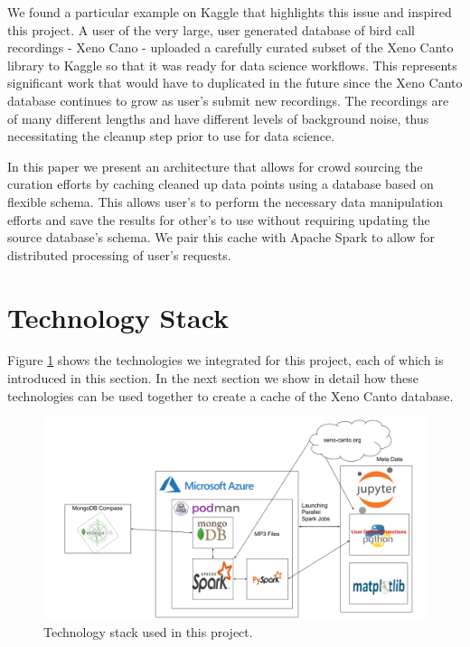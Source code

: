 \documentclass[conference,twoside]{IEEEtran}
\begin{document}
We found a particular example on Kaggle that highlights this issue and inspired this project. A user of the very large, user generated database of bird call recordings - Xeno Cano\cite{xenocanto} - uploaded a carefully curated subset of the Xeno Canto library to Kaggle so that it was ready for data science workflows\cite{xenocantokaggle}. This represents significant work that would have to duplicated in the future since the Xeno Canto database continues to grow as user's submit new recordings. The recordings are of many different lengths and have different levels of background noise, thus necessitating the cleanup step prior to use for data science.

In this paper we present an architecture that allows for crowd sourcing the curation efforts by caching cleaned up data points using a database based on flexible schema. This allows user's to perform the necessary data manipulation efforts and save the results for other's to use without requiring updating the source database's schema. We pair this cache with Apache Spark to allow for distributed processing of user's requests.


\section{Technology Stack}
Figure \ref{fig:tech} shows the technologies we integrated for this project, each of which is introduced in this section. In the next section we show in detail how these technologies can be used together to create a cache of the Xeno Canto database.
\begin{figure}[tb]  %
  \centering
  \includegraphics[width=\textwidth]{tech_stack}
  \caption{Technology stack used in this project.}
  \label{fig:tech}
\end{figure}
\end{document}
